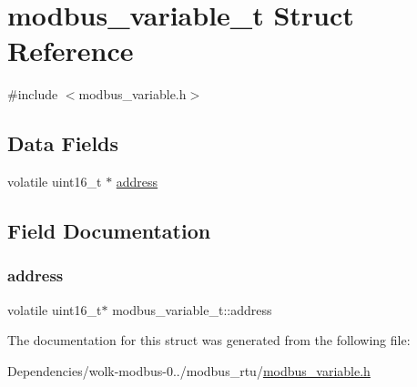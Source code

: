 \hypertarget{structmodbus__variable__t}{}\section{modbus\+\_\+variable\+\_\+t Struct Reference}
\label{structmodbus__variable__t}


{\ttfamily \#include $<$modbus\+\_\+variable.\+h$>$}

\subsection*{Data Fields}
\begin{DoxyCompactItemize}
\item 
volatile uint16\+\_\+t $\ast$ \mbox{\hyperlink{structmodbus__variable__t_a28f4b7f81345537b38ad0927893f526f}{address}}
\end{DoxyCompactItemize}


\subsection{Field Documentation}
\mbox{\label{structmodbus__variable__t_a28f4b7f81345537b38ad0927893f526f}} 
\subsubsection{\texorpdfstring{address}{address}}
{\footnotesize\ttfamily volatile uint16\+\_\+t$\ast$ modbus\+\_\+variable\+\_\+t\+::address}



The documentation for this struct was generated from the following file\+:\begin{DoxyCompactItemize}
\item 
Dependencies/wolk-\/modbus-\/0../modbus\+\_\+rtu/\mbox{\hyperlink{modbus__variable_8h}{modbus\+\_\+variable.\+h}}\end{DoxyCompactItemize}
